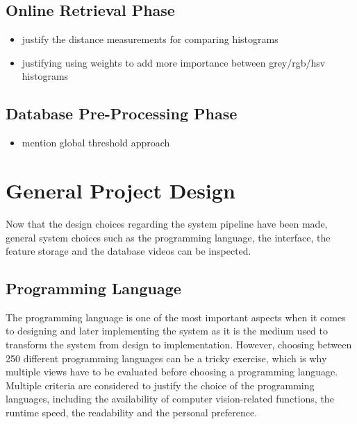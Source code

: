\subsection{Online Retrieval Phase}
\label{sec:design-online-retrieval}

\begin{itemize}
    \item justify the distance measurements for comparing histograms
    \item justifying using weights to add more importance between grey/rgb/hsv histograms
\end{itemize}

\subsection{Database Pre-Processing Phase}

\begin{itemize}
    \item mention global threshold approach
\end{itemize}

\section{General Project Design}

Now that the design choices regarding the system pipeline have been made, general system choices such as the programming language, the interface, the feature storage and the database videos can be inspected.

\subsection{Programming Language}

The programming language is one of the most important aspects when it comes to designing and later implementing the system as it is the medium used to transform the system from design to implementation. However, choosing between 250 different programming languages \cite{tiobe} can be a tricky exercise, which is why multiple views have to be evaluated before choosing a programming language. Multiple criteria are considered to justify the choice of the programming languages, including the availability of computer vision-related functions, the runtime speed, the readability and the personal preference.\\

